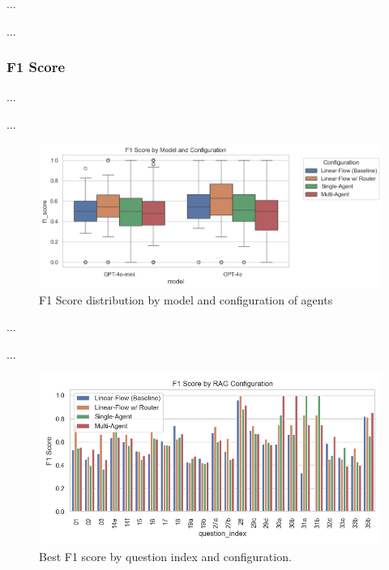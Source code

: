             ...

            ...
        
            \subsubsection{F1 Score}
            
                
                ...

                ...
                
                \begin{figure}
                    \includegraphics[width=0.75\linewidth]{images_exp2/f1_score_by_model_and_configuration.png}
                    \caption{F1 Score distribution by model and configuration of agents}
                    \label{fig:f1_score_by_model_and_configuration}
                \end{figure}
                    
                ...

                ...
                
                
                \begin{figure}
                    \centering
                    \includegraphics[width=0.75\linewidth]{images_exp2/best_f1_by_question_index_and_configuration.png}
                    \caption{Best F1 score by question index and configuration.}
                    \label{fig:best_f1_by_question_index_and_configuration}
                \end{figure}
                
